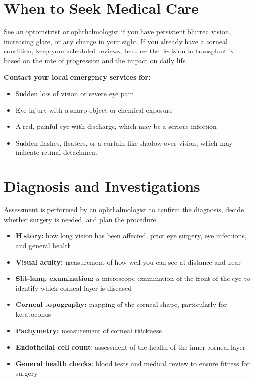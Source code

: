 \section*{When to Seek Medical Care}
See an optometrist or ophthalmologist if you have persistent blurred vision, increasing glare, or any change in your sight. If you already have a corneal condition, keep your scheduled reviews, because the decision to transplant is based on the rate of progression and the impact on daily life.

\textbf{Contact your local emergency services for:}
\begin{itemize}
    \item Sudden loss of vision or severe eye pain
    \item Eye injury with a sharp object or chemical exposure
    \item A red, painful eye with discharge, which may be a serious infection
    \item Sudden flashes, floaters, or a curtain-like shadow over vision, which may indicate retinal detachment
\end{itemize}

\section*{Diagnosis and Investigations}
Assessment is performed by an ophthalmologist to confirm the diagnosis, decide whether surgery is needed, and plan the procedure.

\begin{itemize}
    \item \textbf{History:} how long vision has been affected, prior eye surgery, eye infections, and general health
    \item \textbf{Visual acuity:} measurement of how well you can see at distance and near
    \item \textbf{Slit-lamp examination:} a microscope examination of the front of the eye to identify which corneal layer is diseased
    \item \textbf{Corneal topography:} mapping of the corneal shape, particularly for keratoconus
    \item \textbf{Pachymetry:} measurement of corneal thickness
    \item \textbf{Endothelial cell count:} assessment of the health of the inner corneal layer
    \item \textbf{General health checks:} blood tests and medical review to ensure fitness for surgery
\end{itemize}

